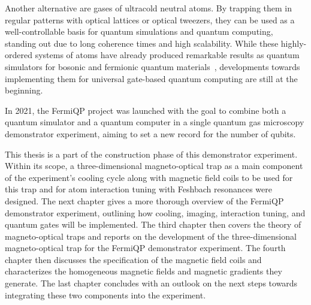 Another alternative are gases of ultracold neutral atoms. By trapping them in regular patterns with optical lattices or optical tweezers, they can be used as a well-controllable basis for quantum simulations and quantum computing, standing out due to long coherence times and high scalability. While these highly-ordered systems of atoms have already produced remarkable results as quantum simulators for bosonic and fermionic quantum materials~\cite{bloch_quantum_2012, gross_quantum_2017}, developments towards implementing them for universal gate-based quantum computing are still at the beginning.

In 2021, the FermiQP project was launched with the goal to combine both a quantum simulator and a quantum computer in a single quantum gas microscopy demonstrator experiment, aiming to set a new record for the number of qubits.

This thesis is a part of the construction phase of this demonstrator experiment. Within its scope, a three-dimensional magneto-optical trap as a main component of the experiment's cooling cycle along with magnetic field coils to be used for this trap and for atom interaction tuning with Feshbach resonances were designed. The next chapter gives a more thorough overview of the FermiQP demonstrator experiment, outlining how cooling, imaging, interaction tuning, and quantum gates will be implemented. The third chapter then covers the theory of magneto-optical traps and reports on the development of the three-dimensional magneto-optical trap for the FermiQP demonstrator experiment. The fourth chapter then discusses the specification of the magnetic field coils and characterizes the homogeneous magnetic fields and magnetic gradients they generate. The last chapter concludes with an outlook on the next steps towards integrating these two components into the experiment.


